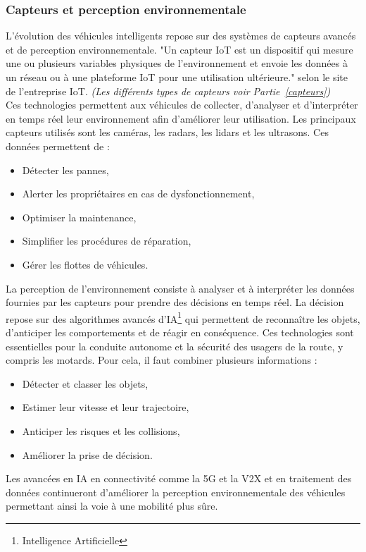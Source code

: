 \subsubsection{Capteurs et perception environnementale}
L'évolution des véhicules intelligents repose sur des systèmes de capteurs avancés et de perception environnementale. "Un capteur IoT est un dispositif qui mesure une ou plusieurs variables physiques de l'environnement et envoie les données à un réseau ou à une plateforme IoT pour une utilisation ultérieure." selon le site de l'entreprise IoT\cite{iot_capteur}. \emph{(Les différents types de capteurs voir Partie~\ref{capteurs})}\\
Ces technologies permettent aux véhicules de collecter, d'analyser et d'interpréter en temps réel leur environnement afin d'améliorer leur utilisation.
Les principaux capteurs utilisés sont les caméras, les radars, les lidars et les ultrasons.
Ces données permettent de :
\begin{itemize}
    \item Détecter les pannes,
    \item Alerter les propriétaires en cas de dysfonctionnement,
    \item Optimiser la maintenance,
    \item Simplifier les procédures de réparation,
    \item Gérer les flottes de véhicules. 
\end{itemize}


La perception de l'environnement consiste à analyser et à interpréter les données fournies par les capteurs pour prendre des décisions en temps réel. La décision repose sur des algorithmes avancés d'IA\footnote{Intelligence Artificielle} qui permettent de reconnaître les objets, d'anticiper les comportements et de réagir en conséquence. Ces technologies sont essentielles pour la conduite autonome et la sécurité des usagers de la route, y compris les motards.
Pour cela, il faut combiner plusieurs informations :
\begin{itemize}
    \item Détecter et classer les objets,
    \item Estimer leur vitesse et leur trajectoire,
    \item Anticiper les risques et les collisions,
    \item Améliorer la prise de décision.
\end{itemize}
Les avancées en IA en connectivité comme la 5G et la V2X et en traitement des données continueront d’améliorer la perception environnementale des véhicules permettant ainsi la voie à une mobilité plus sûre.

